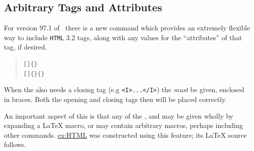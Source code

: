 \subsection{Arbitrary Tags and Attributes\label{sec:arbtags}}%
%
For version 97.1 of \latextohtml\ there is a new command which provides 
an extremely flexible way to include \texttt{HTML} 3.2 tags, along with
any values for the ``attributes'' of that tag, if desired.
\begin{quote}
\verb|[|\verb|]{|\verb|}|\label{HTMLtag}\\
\verb|[|\verb|]{|\verb|}{|\verb|}|
\end{quote}
When the  also needs a closing tag (e.g \texttt{<I>...</I>})
the  \emph{must} be given, enclosed in braces.
Both the opening and closing tags then will be placed correctly.


An important aspect of this is that any of the ,
 and  may be given wholly
by expanding a \LaTeX{} macro, or may contain arbitrary macros, 
perhaps including other  commands.
\hyperref{The following table}{The contents of Figure~}{}{ex:HTML} 
was constructed using this feature; its \LaTeX{} source follows.


